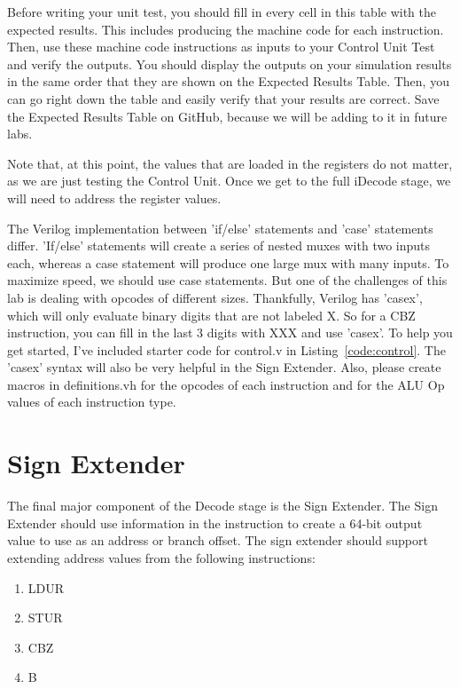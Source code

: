 Before writing your unit test, you should fill in every cell in this table with the expected results.  This includes producing the machine code for each instruction.  Then, use these machine code instructions as inputs to your Control Unit Test and verify the outputs.  You should display the outputs on your simulation results in the same order that they are shown on the Expected Results Table.  Then, you can go right down the table and easily verify that your results are correct.  Save the Expected Results Table on GitHub, because we will be adding to it in future labs.

Note that, at this point, the values that are loaded in the registers do not matter, as we are just testing the Control Unit.  Once we get to the full iDecode stage, we will need to address the register values.

The Verilog implementation between 'if/else' statements and 'case' statements differ.  'If/else' statements will create a series of nested muxes with two inputs each, whereas a case statement will produce one large mux with many inputs.  To maximize speed, we should use case statements.  But one of the challenges of this lab is dealing with opcodes of different sizes.  Thankfully, Verilog has 'casex', which will only evaluate binary digits that are not labeled X.  So for a CBZ instruction, you can fill in the last 3 digits with XXX and use 'casex'.  To help you get started, I've included starter code for control.v in  Listing~\ref{code:control}.  The 'casex' syntax will also be very helpful in the Sign Extender.  Also, please create macros in definitions.vh for the opcodes of each instruction and for the ALU Op values of each instruction type.


\section{Sign Extender}
The final major component of the Decode stage is the Sign Extender.  The Sign Extender should use information in the instruction to create a 64-bit output value to use as an address or branch offset.  The sign extender should support extending address values from the following instructions:
\begin{enumerate}
	\item LDUR
	\item STUR
	\item CBZ
	\item B
\end{enumerate}

